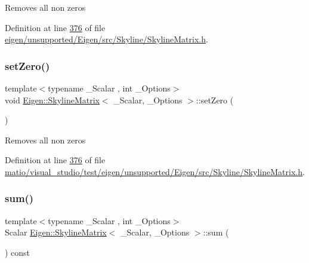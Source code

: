 Removes all non zeros 

Definition at line \hyperlink{eigen_2unsupported_2_eigen_2src_2_skyline_2_skyline_matrix_8h_source_l00376}{376} of file \hyperlink{eigen_2unsupported_2_eigen_2src_2_skyline_2_skyline_matrix_8h_source}{eigen/unsupported/\+Eigen/src/\+Skyline/\+Skyline\+Matrix.\+h}.

\mbox{\label{class_eigen_1_1_skyline_matrix_afeb349e5dc4b5d8c107ff067b44438f5}} 
\subsubsection{\texorpdfstring{set\+Zero()}{setZero()}\hspace{0.1cm}{\footnotesize\ttfamily [2/2]}}
{\footnotesize\ttfamily template$<$typename \+\_\+\+Scalar , int \+\_\+\+Options$>$ \\
void \hyperlink{class_eigen_1_1_skyline_matrix}{Eigen\+::\+Skyline\+Matrix}$<$ \+\_\+\+Scalar, \+\_\+\+Options $>$\+::set\+Zero (\begin{DoxyParamCaption}{ }\end{DoxyParamCaption})\hspace{0.3cm}{\ttfamily [inline]}}

Removes all non zeros 

Definition at line \hyperlink{matio_2visual__studio_2test_2eigen_2unsupported_2_eigen_2src_2_skyline_2_skyline_matrix_8h_source_l00376}{376} of file \hyperlink{matio_2visual__studio_2test_2eigen_2unsupported_2_eigen_2src_2_skyline_2_skyline_matrix_8h_source}{matio/visual\+\_\+studio/test/eigen/unsupported/\+Eigen/src/\+Skyline/\+Skyline\+Matrix.\+h}.

\mbox{\label{class_eigen_1_1_skyline_matrix_a56c9841de52e52744a2d5e6593979154}} 
\subsubsection{\texorpdfstring{sum()}{sum()}\hspace{0.1cm}{\footnotesize\ttfamily [1/2]}}
{\footnotesize\ttfamily template$<$typename \+\_\+\+Scalar , int \+\_\+\+Options$>$ \\
Scalar \hyperlink{class_eigen_1_1_skyline_matrix}{Eigen\+::\+Skyline\+Matrix}$<$ \+\_\+\+Scalar, \+\_\+\+Options $>$\+::sum (\begin{DoxyParamCaption}{ }\end{DoxyParamCaption}) const}

